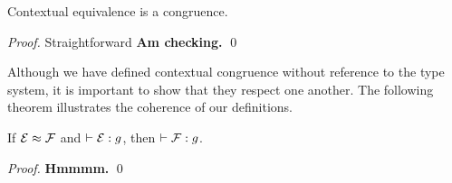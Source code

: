 \documentclass[orivec,envcountsame]{llncs}
\newcommand{\Eq}{\approx}
\newcommand{\Theorem}{\vdash}
\newcommand{\OfType}{\mathrel{:}}
\begin{document}
\begin{lemma}
Contextual equivalence is a congruence.
\end{lemma}
\begin{proof}
Straightforward \textbf{Am checking.}
\qed \end{proof}

Although we have defined contextual congruence without reference to the type system, it is important to show that they respect one another. The following theorem illustrates the coherence of our definitions.

\begin{theorem}
If $\expr \Eq \exprb$ and $\Theorem \expr \OfType g$, then $\Theorem \exprb \OfType g$.
\end{theorem}
\begin{proof}
\textbf{Hmmmm.} 
\qed \end{proof}



\end{document}
